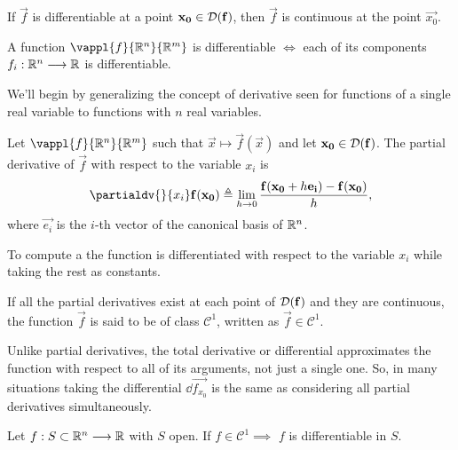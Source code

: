 \begin{prop}
    If $\vec{f}$ is differentiable at a point $\vec{x_0}\in\dom{\vec{f}}$, then $\vec{f}$ is continuous at 
    the point $\vec{x_0}$.
\end{prop}

\begin{prop}
    A function $\vappl{f}{\Rtn}{\R^m}$ is differentiable $\iff$ each of its components $\appl{f_i}{\Rtn}{\R}$ is
    differentiable.
\end{prop}

We'll begin by generalizing the concept of derivative seen for functions of a single real variable to functions with
$n$ real variables.

\begin{defn}\label{def:partial-derivative}
    Let $\vappl{f}{\Rtn}{\R^m}$ such that $\vec{x}\longmapsto \vec{f}(\vec{x})$ and let $\vec{x_0}\in\dom{\vec{f}}$. 
    The partial derivative of $\vec{f}$ with respect to the variable $x_i$ is
    \begin{equation}
        \partialdv{}{x_i} \vec{f}(\vec{x_0})\bydef\lim_{h\to 0}\frac{\vec{f}(\vec{x_0} + h\vec{e_i}) - \vec{f}(\vec{x_0})}{h},
    \end{equation}
    where $\vec{e_i}$ is the $i$-th vector of the canonical basis of $\Rtn$.
\end{defn}

\begin{remark}
    To compute a  the function is differentiated with respect to the variable $x_i$ while taking 
    the rest as constants.
\end{remark}

\begin{note}
    If all the partial derivatives exist at each point of $\dom{\vec{f}}$ and they are continuous, the function $\vec{f}$ is
    said to be of class $\mathcal{C}^1$, written as $\vec{f}\in\mathcal{C}^1$.
\end{note}

Unlike partial derivatives, the total derivative or differential approximates the function with respect to all of its
arguments, not just a single one. So, in many situations taking the differential $\dd\vec{f_{x_0}}$ is the same as 
considering all partial derivatives simultaneously.

\begin{theorem}
    Let $\appl{f}{S\subset\Rtn}{\R}$ with $S$ open. If $f\in\mathcal{C}^1\implies$ $f$ is differentiable in $S$.
\end{theorem}

